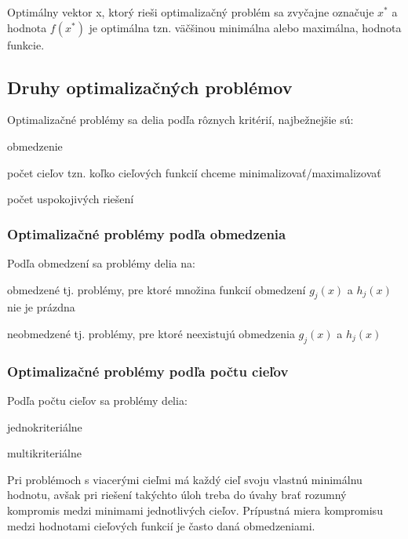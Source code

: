 Optimálny vektor x, ktorý rieši optimalizačný problém sa zvyčajne označuje \(x^*\) a hodnota \(f(x^*)\) je optimálna tzn. väčšinou minimálna alebo maximálna, hodnota funkcie\cite{1}.

\subsection{Druhy optimalizačných problémov}

Optimalizačné problémy sa delia podľa rôznych kritérií, najbežnejšie sú:

\begin{my_itemize}
 \item obmedzenie
 \item počet cieľov tzn. koľko cieľových funkcií chceme minimalizovať/maximalizovať
 \item počet uspokojivých riešení
\end{my_itemize}

\subsubsection{Optimalizačné problémy podľa obmedzenia}

Podľa obmedzení sa problémy delia na:

\begin{my_itemize}
 \item obmedzené tj. problémy, pre ktoré množina funkcií obmedzení \(g_j(x)\) a \(h_j(x)\) nie je prázdna
 \item neobmedzené tj. problémy, pre ktoré neexistujú obmedzenia \(g_j(x)\) a \(h_j(x)\)
\end{my_itemize}

\subsubsection{Optimalizačné problémy podľa počtu cieľov}

Podľa počtu cieľov sa problémy delia:
\begin{my_itemize}
 \item jednokriteriálne
 \item multikriteriálne
\end{my_itemize}

Pri problémoch s viacerými cieľmi má každý cieľ svoju vlastnú minimálnu hodnotu, avšak pri riešení takýchto úloh treba do úvahy brať rozumný kompromis medzi minimami jednotlivých cieľov. Prípustná miera kompromisu medzi hodnotami cieľových funkcií je často daná obmedzeniami. 

